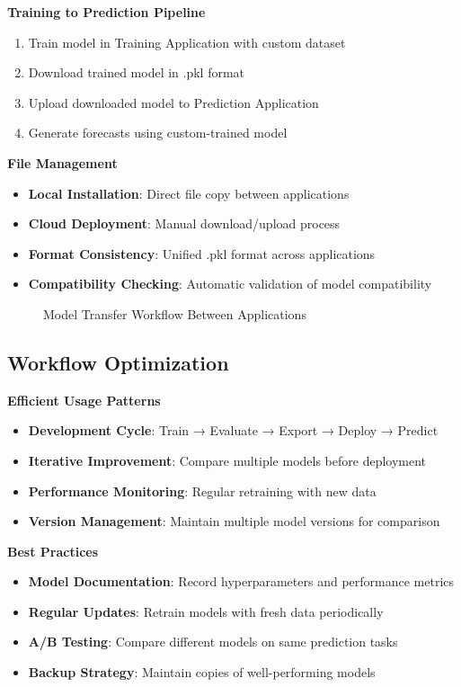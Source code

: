 \textbf{Training to Prediction Pipeline}
\begin{enumerate}
	\item Train model in Training Application with custom dataset
	\item Download trained model in .pkl format
	\item Upload downloaded model to Prediction Application
	\item Generate forecasts using custom-trained model
\end{enumerate}

\textbf{File Management}
\begin{itemize}
	\item \textbf{Local Installation}: Direct file copy between applications
	\item \textbf{Cloud Deployment}: Manual download/upload process
	\item \textbf{Format Consistency}: Unified .pkl format across applications
	\item \textbf{Compatibility Checking}: Automatic validation of model compatibility
\end{itemize}

\begin{figure}[H]
	\centering
	
	\caption{Model Transfer Workflow Between Applications}
	\label{fig:model_transfer_workflow}
\end{figure}

\subsection{Workflow Optimization}

\textbf{Efficient Usage Patterns}
\begin{itemize}
	\item \textbf{Development Cycle}: Train → Evaluate → Export → Deploy → Predict
	\item \textbf{Iterative Improvement}: Compare multiple models before deployment
	\item \textbf{Performance Monitoring}: Regular retraining with new data
	\item \textbf{Version Management}: Maintain multiple model versions for comparison
\end{itemize}

\textbf{Best Practices}
\begin{itemize}
	\item \textbf{Model Documentation}: Record hyperparameters and performance metrics
	\item \textbf{Regular Updates}: Retrain models with fresh data periodically
	\item \textbf{A/B Testing}: Compare different models on same prediction tasks
	\item \textbf{Backup Strategy}: Maintain copies of well-performing models
\end{itemize}

